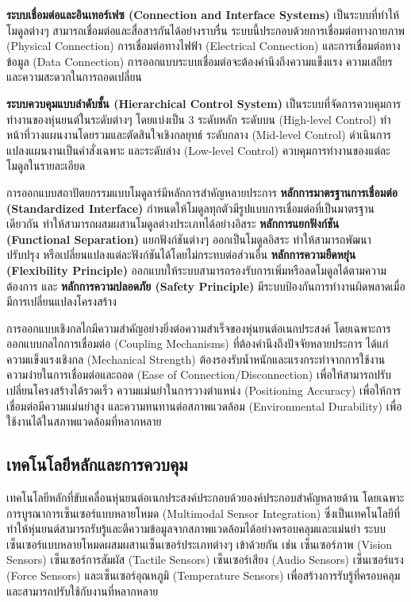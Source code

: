 \documentclass[a4paper]{article}
\begin{document}
\textbf{ระบบเชื่อมต่อและอินเทอร์เฟซ (Connection and Interface Systems)} เป็นระบบที่ทำให้โมดูลต่างๆ สามารถเชื่อมต่อและสื่อสารกันได้อย่างราบรื่น ระบบนี้ประกอบด้วยการเชื่อมต่อทางกายภาพ (Physical Connection) การเชื่อมต่อทางไฟฟ้า (Electrical Connection) และการเชื่อมต่อทางข้อมูล (Data Connection) การออกแบบระบบเชื่อมต่อจะต้องคำนึงถึงความแข็งแรง ความเสถียร และความสะดวกในการถอดเปลี่ยน

\textbf{ระบบควบคุมแบบลำดับชั้น (Hierarchical Control System)} เป็นระบบที่จัดการควบคุมการทำงานของหุ่นยนต์ในระดับต่างๆ โดยแบ่งเป็น 3 ระดับหลัก ระดับบน (High-level Control) ทำหน้าที่วางแผนงานโดยรวมและตัดสินใจเชิงกลยุทธ์ ระดับกลาง (Mid-level Control) ดำเนินการแปลงแผนงานเป็นคำสั่งเฉพาะ และระดับล่าง (Low-level Control) ควบคุมการทำงานของแต่ละโมดูลในรายละเอียด \parencite{tassi2024multimodal}

การออกแบบสถาปัตยกรรมแบบโมดูลาร์มีหลักการสำคัญหลายประการ \textbf{หลักการมาตรฐานการเชื่อมต่อ (Standardized Interface)} กำหนดให้โมดูลทุกตัวมีรูปแบบการเชื่อมต่อที่เป็นมาตรฐานเดียวกัน ทำให้สามารถผสมผสานโมดูลต่างประเภทได้อย่างอิสระ \textbf{หลักการแยกฟังก์ชัน (Functional Separation)} แยกฟังก์ชันต่างๆ ออกเป็นโมดูลอิสระ ทำให้สามารถพัฒนา ปรับปรุง หรือเปลี่ยนแปลงแต่ละฟังก์ชันได้โดยไม่กระทบต่อส่วนอื่น \textbf{หลักการความยืดหยุ่น (Flexibility Principle)} ออกแบบให้ระบบสามารถรองรับการเพิ่มหรือลดโมดูลได้ตามความต้องการ และ \textbf{หลักการความปลอดภัย (Safety Principle)} มีระบบป้องกันการทำงานผิดพลาดเมื่อมีการเปลี่ยนแปลงโครงสร้าง

การออกแบบเชิงกลไกมีความสำคัญอย่างยิ่งต่อความสำเร็จของหุ่นยนต์อเนกประสงค์ โดยเฉพาะการออกแบบกลไกการเชื่อมต่อ (Coupling Mechanisms) ที่ต้องคำนึงถึงปัจจัยหลายประการ ได้แก่ ความแข็งแรงเชิงกล (Mechanical Strength) ต้องรองรับน้ำหนักและแรงกระทำจากการใช้งาน ความง่ายในการเชื่อมต่อและถอด (Ease of Connection/Disconnection) เพื่อให้สามารถปรับเปลี่ยนโครงสร้างได้รวดเร็ว ความแม่นยำในการวางตำแหน่ง (Positioning Accuracy) เพื่อให้การเชื่อมต่อมีความแม่นยำสูง และความทนทานต่อสภาพแวดล้อม (Environmental Durability) เพื่อใช้งานได้ในสภาพแวดล้อมที่หลากหลาย \parencite{krishnan2023deep}

\subsection{เทคโนโลยีหลักและการควบคุม}

เทคโนโลยีหลักที่ขับเคลื่อนหุ่นยนต์อเนกประสงค์ประกอบด้วยองค์ประกอบสำคัญหลายด้าน โดยเฉพาะการบูรณาการเซ็นเซอร์แบบหลายโหมด (Multimodal Sensor Integration) ซึ่งเป็นเทคโนโลยีที่ทำให้หุ่นยนต์สามารถรับรู้และตีความข้อมูลจากสภาพแวดล้อมได้อย่างครอบคลุมและแม่นยำ \parencite{yang2024body} ระบบเซ็นเซอร์แบบหลายโหมดผสมผสานเซ็นเซอร์ประเภทต่างๆ เข้าด้วยกัน เช่น เซ็นเซอร์ภาพ (Vision Sensors) เซ็นเซอร์การสัมผัส (Tactile Sensors) เซ็นเซอร์เสียง (Audio Sensors) เซ็นเซอร์แรง (Force Sensors) และเซ็นเซอร์อุณหภูมิ (Temperature Sensors) เพื่อสร้างการรับรู้ที่ครอบคลุมและสามารถปรับใช้กับงานที่หลากหลาย
\end{document}
